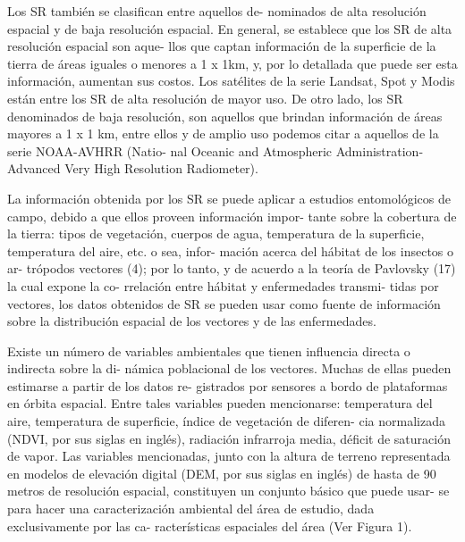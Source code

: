 Los SR también se clasifican entre aquellos de-
nominados de alta resolución espacial y de baja
resolución espacial. En general, se establece
que los SR de alta resolución espacial son aque-
llos que captan información de la superficie de
la tierra de áreas iguales o menores a 1 x 1km, y,
por lo detallada que puede ser esta información,
aumentan sus costos. Los satélites de la serie
Landsat, Spot y Modis están entre los SR de alta
resolución de mayor uso. De otro lado, los SR
denominados de baja resolución, son aquellos
que brindan información de áreas mayores a 1
x 1 km, entre ellos y de amplio uso podemos
citar a aquellos de la serie NOAA-AVHRR (Natio-
nal Oceanic and Atmospheric Administration-Advanced
Very High Resolution Radiometer).

La información obtenida por los SR se puede
aplicar a estudios entomológicos de campo,
debido a que ellos proveen información impor-
tante sobre la cobertura de la tierra: tipos de
vegetación, cuerpos de agua, temperatura de la
superficie, temperatura del aire, etc. o sea, infor-
mación acerca del hábitat de los insectos o ar-
trópodos vectores (4); por lo tanto, y de acuerdo
a la teoría de Pavlovsky (17) la cual expone la co-
rrelación entre hábitat y enfermedades transmi-
tidas por vectores, los datos obtenidos de SR se
pueden usar como fuente de información sobre
la distribución espacial de los vectores y de las
enfermedades.


Existe un número de variables ambientales que
tienen influencia directa o indirecta sobre la di-
námica poblacional de los vectores. Muchas de
ellas pueden estimarse a partir de los datos re-
gistrados por sensores a bordo de plataformas
en órbita espacial. Entre tales variables pueden
mencionarse: temperatura del aire, temperatura
de superficie, índice de vegetación de diferen-
cia normalizada (NDVI, por sus siglas en inglés),
radiación infrarroja media, déficit de saturación
de vapor. Las variables mencionadas, junto con
la altura de terreno representada en modelos de
elevación digital (DEM, por sus siglas en inglés)
de hasta de 90 metros de resolución espacial,
constituyen un conjunto básico que puede usar-
se para hacer una caracterización ambiental del
área de estudio, dada exclusivamente por las ca-
racterísticas espaciales del área (Ver Figura 1).

